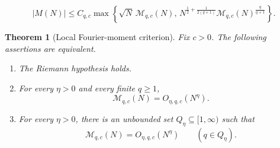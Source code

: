 \documentclass[10pt,a4paper]{amsart}
\newtheorem{theorem}{Theorem}
\newcommand{\Mcal}{\mathcal M}
\begin{document}
\begin{equation}\label{eq:Mertens-local}
 |M(N)|
 \leq C_{q,c}
 \max\left\{
 \sqrt N\,\Mcal_{q,c}(N),
 \,
 N^{\frac12+\frac{1}{2(q+1)}}
 \Mcal_{q,c}(N)^{\frac{q}{q+1}}
 \right\}.
\end{equation}

\begin{theorem}[Local Fourier-moment criterion]\label{thm:fourier}
Fix \(c>0\).  The following assertions are equivalent.
\begin{enumerate}[label=\textup{(\roman*)}]
\item The Riemann hypothesis holds.
\item For every \(\eta>0\) and every finite \(q\ge1\),
\[
\Mcal_{q,c}(N)=O_{\eta,q,c}(N^\eta).
\]
\item For every \(\eta>0\), there is an unbounded set
\(Q_\eta\subseteq[1,\infty)\) such that
\[
\Mcal_{q,c}(N)=O_{\eta,q,c}(N^\eta)
\qquad(q\in Q_\eta).
\]
\end{enumerate}
\end{theorem}
\end{document}
